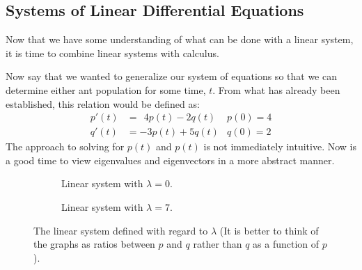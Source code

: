\subsection{Systems of Linear Differential Equations} \label{sec:ode-sys}

Now that we have some understanding of what can be done with a linear system, it is time to combine linear systems with calculus.

Now say that we wanted to generalize our system of equations so that we can determine either ant population for some time, $t$.
From what has already been established, this relation would be defined as:
\begin{align*}
	p'(t) &=\ \ 4p(t) - 2q(t) &p(0) = 4\\
	q'(t) &= -3p(t) + 5q(t) &q(0) = 2
\end{align*}
The approach to solving for $p(t)$ and $p(t)$ is not immediately intuitive. Now is a good time to view eigenvalues and eigenvectors in a more abstract manner.
\begin{figure}[H]
	\centering
	\captionsetup[subfigure]{justification=centering}
	\begin{subfigure}[b]{0.4\textwidth}
		\centering
		\caption{\small Linear system with $\lambda = 0$.}
		\label{fig:sample-eigens0}
	\end{subfigure}
	\quad
	\begin{subfigure}[b]{0.4\textwidth}
		\centering
		\caption{\small Linear system with $\lambda = 7$.}
		\label{fig:sample-eigens1}
	\end{subfigure}
	\caption{The linear system defined with regard to $\lambda$ (It is better to think of the graphs as ratios between $p$ and $q$ rather than $q$ as a function of $p$).}
	\label{fig:sample-eigens}
\end{figure}
